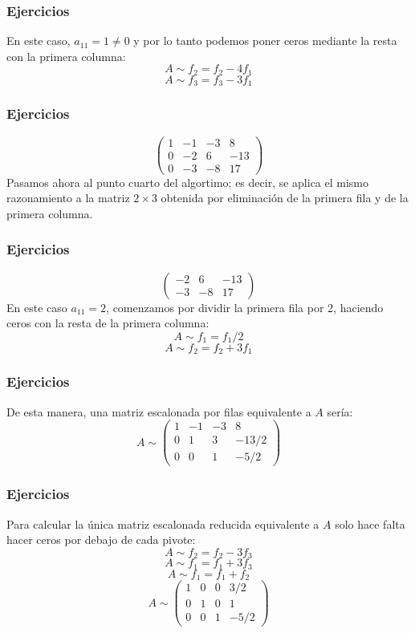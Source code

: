 \documentclass[12pt]{article}
\begin{document}
     \begin{frame}
  \frametitle{Ejercicios}

En este caso, $a_{11}=1\neq0$ y por lo tanto podemos poner ceros mediante la resta con la primera columna:
\[A \sim f_2 = f_2-4f_1\]
\[A\sim f_3 = f_3-3f_1\]
  \end{frame}
  
  
       \begin{frame}
  \frametitle{Ejercicios}

\[\left(\begin{array}{cccc}1 & -1 & -3 & 8 \\0 & -2 & 6 & -13 \\0 & -3 & -8 & 17\end{array}\right)\]
Pasamos ahora al punto cuarto del algortimo; es decir, se aplica el mismo razonamiento a la matriz $2\times3$ obtenida por eliminaci\'on de la primera fila y de la primera columna.
  \end{frame}  
  
  
  \begin{frame}
  \frametitle{Ejercicios}
\[\left(\begin{array}{ccc} -2 & 6 & -13 \\ -3 & -8 & 17\end{array}\right)\]
En este caso $a_{11} = 2$, comenzamos por dividir la primera fila por 2, haciendo ceros con la resta de la primera columna:
\[A\sim f_1 = f_1/2\]
\[A\sim f_2 = f_2+3f_1\]
  \end{frame}  
  
    \begin{frame}
  \frametitle{Ejercicios}
De esta manera, una matriz escalonada por filas equivalente a $A$ ser\'ia:
\[A\sim \left(\begin{array}{cccc}1 & -1 & -3 & 8 \\0 & 1 & 3 & -13/2 \\0 & 0 & 1 & -5/2\end{array}\right)\]

  \end{frame}  
  
  
    \begin{frame}
  \frametitle{Ejercicios}
Para calcular la \'unica matriz escalonada reducida equivalente a $A$ solo hace falta hacer ceros por debajo de cada pivote:
\[A\sim f_2 = f_2-3f_3\]
\[A\sim f_1 = f_1+3f_3\]
\[A\sim f_1 = f_1+f_2\]
\[A\sim \left(\begin{array}{cccc}1 & 0 & 0 & 3/2 \\0 & 1 & 0 & 1 \\0 & 0 & 1 & -5/2\end{array}\right)\]
  \end{frame}  
    
\end{document}
